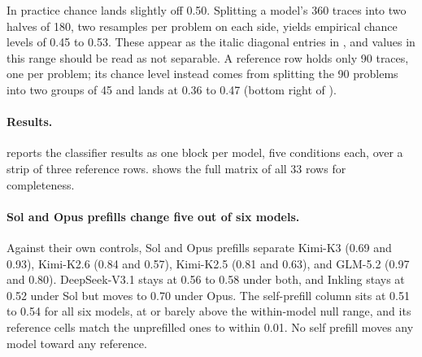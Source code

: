 

In practice chance lands slightly off 0.50. Splitting a model's 360 traces into two halves of 180, two resamples per problem on each side, yields empirical chance levels of 0.45 to 0.53. These appear as the italic diagonal entries in , and values in this range should be read as not separable. A reference row holds only 90 traces, one per problem; its chance level instead comes from splitting the 90 problems into two groups of 45 and lands at 0.36 to 0.47 (bottom right of ).



\paragraph{Results.}  reports the classifier results as one block per model, five conditions each, over a strip of three reference rows.  shows the full matrix of all 33 rows for completeness.

\paragraph{Sol and Opus prefills change five out of six models.} 
Against their own controls, Sol and Opus prefills separate Kimi-K3 (0.69 and 0.93), Kimi-K2.6 (0.84 and 0.57), Kimi-K2.5 (0.81 and 0.63), and GLM-5.2 (0.97 and 0.80). DeepSeek-V3.1 stays at 0.56 to 0.58 under both, and Inkling stays at 0.52 under Sol but moves to 0.70 under Opus. The self-prefill column sits at 0.51 to 0.54 for all six models, at or barely above the within-model null range, and its reference cells match the unprefilled ones to within 0.01. No self prefill moves any model toward any reference.

